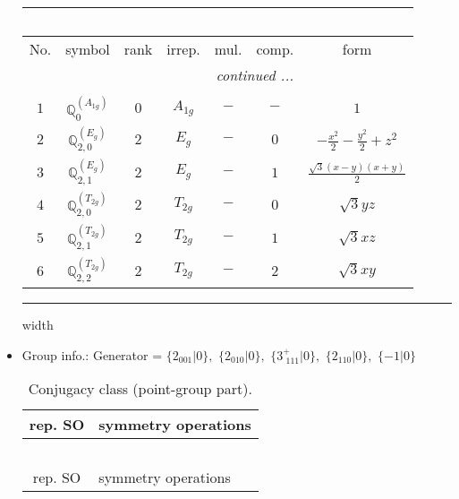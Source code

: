 \documentclass[fleqn,10pt,landscape]{article}
\begin{document}
\begin{itemize}
\begin{center}
\begin{longtable}{ccccccc}
\multicolumn{6}{l}{\tablename\ \thetable{}} \\
 \hline \hline
No. & symbol & rank & irrep. & mul. & comp. & form \\ \hline \endhead

 \hline \hline
\multicolumn{6}{r}{\footnotesize\it continued ...} \\ \endfoot

 \hline \hline
\multicolumn{6}{r}{} \\ \endlastfoot

$ 1 $ & $ \mathbb{Q}_{0}^{(A_{1g})} $ & $ 0 $ & $ A_{1g} $ & $ - $ & $ - $ & $ 1 $ \\ \hline
$ 2 $ & $ \mathbb{Q}_{2,0}^{(E_{g})} $ & $ 2 $ & $ E_{g} $ & $ - $ & $ 0 $ & $ - \frac{x^{2}}{2} - \frac{y^{2}}{2} + z^{2} $ \\
$ 3 $ & $ \mathbb{Q}_{2,1}^{(E_{g})} $ & $ 2 $ & $ E_{g} $ & $ - $ & $ 1 $ & $ \frac{\sqrt{3} \left(x - y\right) \left(x + y\right)}{2} $ \\
$ 4 $ & $ \mathbb{Q}_{2,0}^{(T_{2g})} $ & $ 2 $ & $ T_{2g} $ & $ - $ & $ 0 $ & $ \sqrt{3} y z $ \\
$ 5 $ & $ \mathbb{Q}_{2,1}^{(T_{2g})} $ & $ 2 $ & $ T_{2g} $ & $ - $ & $ 1 $ & $ \sqrt{3} x z $ \\
$ 6 $ & $ \mathbb{Q}_{2,2}^{(T_{2g})} $ & $ 2 $ & $ T_{2g} $ & $ - $ & $ 2 $ & $ \sqrt{3} x y $ \\
\end{longtable}
\end{center}

 \hfil \hrule height 1mm width \textwidth \hfil

\item Group info.: Generator = $\{2{}_{001}|0\},\,\,\{2{}_{010}|0\},\,\,\{3^{+}_{\,\,111}|0\},\,\,\{2{}_{110}|0\},\,\,\{-1|0\}$

\begin{center}
\renewcommand{\arraystretch}{1.3}
\begin{longtable}{c|l}
\caption{Conjugacy class (point-group part).}
 \\
 \hline \hline
rep. SO & symmetry operations \\ \hline \endfirsthead

\multicolumn{1}{l}{\tablename\ \thetable{}} \\
 \hline \hline
rep. SO & symmetry operations \\ \hline \endhead


\end{longtable}
\end{center}
\end{itemize}
\end{document}
